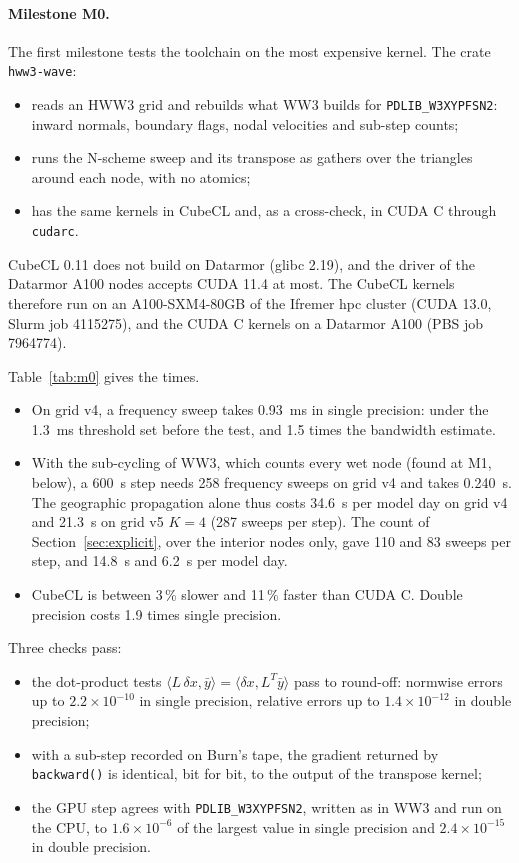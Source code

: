 \documentclass[11pt,a4paper]{article}
\begin{document}
\paragraph{Milestone M0.} The first milestone tests the toolchain on the
most expensive kernel. The crate \texttt{hww3-wave}:
\begin{itemize}
\item reads an HWW3 grid and rebuilds what WW3 builds for
\texttt{PDLIB\_W3XYPFSN2}: inward normals, boundary flags, nodal velocities
and sub-step counts;
\item runs the N-scheme sweep and its transpose as gathers over the
triangles around each node, with no atomics;
\item has the same kernels in CubeCL and, as a cross-check, in CUDA C
through \texttt{cudarc}.
\end{itemize}

CubeCL 0.11 does not build on Datarmor (glibc 2.19), and the driver of the
Datarmor A100 nodes accepts CUDA 11.4 at most. The CubeCL kernels therefore
run on an A100-SXM4-80GB of the Ifremer hpc cluster (CUDA 13.0, Slurm job
4115275), and the CUDA C kernels on a Datarmor A100 (PBS job 7964774).

Table~\ref{tab:m0} gives the times.
\begin{itemize}
\item On grid v4, a frequency sweep takes \SI{0.93}{ms} in single
precision: under the \SI{1.3}{ms} threshold set before the test, and 1.5
times the bandwidth estimate.
\item With the sub-cycling of WW3, which counts every wet node (found at
M1, below), a \SI{600}{s} step needs 258 frequency sweeps on grid v4 and
takes \SI{0.240}{s}. The geographic propagation alone thus costs
\SI{34.6}{s} per model day on grid v4 and \SI{21.3}{s} on grid v5 $K=4$
(287 sweeps per step). The count of Section~\ref{sec:explicit}, over the
interior nodes only, gave 110 and 83 sweeps per step, and \SI{14.8}{s} and
\SI{6.2}{s} per model day.
\item CubeCL is between 3\,\% slower and 11\,\% faster than CUDA C. Double
precision costs 1.9 times single precision.
\end{itemize}

Three checks pass:
\begin{itemize}
\item the dot-product tests
$\langle L\,\delta x,\bar y\rangle=\langle\delta x, L^T\bar y\rangle$ pass
to round-off: normwise errors up to $2.2\times10^{-10}$ in single
precision, relative errors up to $1.4\times10^{-12}$ in double precision;
\item with a sub-step recorded on Burn's tape, the gradient returned by
\texttt{backward()} is identical, bit for bit, to the output of the
transpose kernel;
\item the GPU step agrees with \texttt{PDLIB\_W3XYPFSN2}, written as in WW3
and run on the CPU, to $1.6\times10^{-6}$ of the largest value in single
precision and $2.4\times10^{-15}$ in double precision.
\end{itemize}
\end{document}
